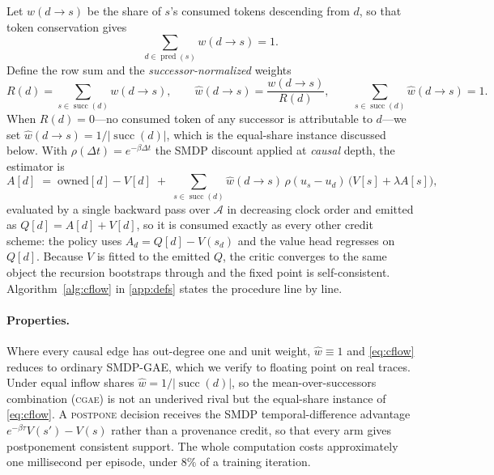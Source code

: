 \documentclass[review,authoryear,3p,times]{elsarticle}
\newcommand{\cgae}{\textsc{cgae}}              %
\newcommand{\Ascr}{\mathcal{A}}
\newcommand{\pred}{\operatorname{pred}}
\newcommand{\suc}{\operatorname{succ}}
\begin{document}
Let $w(d\!\to\!s)$ be the share of $s$'s consumed tokens descending from $d$, so
that token conservation gives
\begin{equation}
\sum_{d\in\pred(s)} w(d\!\to\!s) = 1 .
\label{eq:predsum}
\end{equation}
Define the row sum and the \emph{successor-normalized} weights
\begin{equation}
R(d) = \sum_{s\in\suc(d)} w(d\!\to\!s), \qquad
\hat{w}(d\!\to\!s) = \frac{w(d\!\to\!s)}{R(d)},\qquad
\sum_{s\in\suc(d)}\hat{w}(d\!\to\!s)=1 .
\label{eq:sucsum}
\end{equation}
When $R(d)=0$---no consumed token of any successor is attributable to $d$---we
set $\hat w(d\!\to\!s)=1/|\suc(d)|$, which is the equal-share instance discussed
below.
With $\rho(\Delta t)=e^{-\beta\Delta t}$ the SMDP discount applied at
\emph{causal} depth, the estimator is
\begin{equation}
A[d] \;=\; \mathrm{owned}[d] - V[d]
\;+\; \sum_{s\in\suc(d)} \hat{w}(d\!\to\!s)\,\rho(u_s-u_d)\,
      \bigl( V[s] + \lambda A[s] \bigr),
\label{eq:cflow}
\end{equation}
evaluated by a single backward pass over $\Ascr$ in decreasing clock order and
emitted as $Q[d]=A[d]+V[d]$, so it is consumed exactly as every other credit
scheme: the policy uses $A_d = Q[d]-V(s_d)$ and the value head regresses on
$Q[d]$. Because $V$ is fitted to the emitted $Q$, the critic converges to the
same object the recursion bootstraps through and the fixed point is
self-consistent. Algorithm~\ref{alg:cflow} in \ref{app:defs} states
the procedure line by line.


\paragraph{Properties.} Where every causal edge has out-degree one and unit
weight, $\hat w\equiv1$ and \eqref{eq:cflow} reduces to ordinary SMDP-GAE, which
we verify to floating point on real traces. Under equal inflow shares
$\hat w=1/|\suc(d)|$, so the mean-over-successors combination (\cgae) is not an
underived rival but the equal-share instance of \eqref{eq:cflow}. A
\textsc{postpone} decision receives the SMDP temporal-difference advantage
$e^{-\beta\tau}V(s')-V(s)$ rather than a provenance credit, so that every arm
gives postponement consistent support. The whole computation costs approximately
one millisecond per episode, under $8\%$ of a training iteration.

\end{document}
